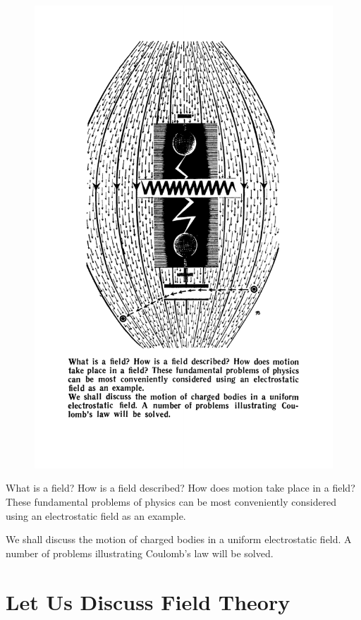 \documentclass[a4paper,sfsidenotes]{tufte-book}
\begin{document}
\begin{figure}
\centering
\includegraphics[width=0.65\linewidth]{sec-i.pdf}
\end{figure}
\begin{fullwidth}
\begin{Large}
What is a field? How is a field described? How does motion take place in a field? These fundamental problems of physics can be most conveniently considered using an electrostatic field as an example.

We shall discuss the motion of charged bodies in a uniform electrostatic field. A number of problems illustrating Coulomb's law will be solved.
\end{Large}
\end{fullwidth}

\chapter{Let Us Discuss Field Theory}
\label{ch-22}
\end{document}
